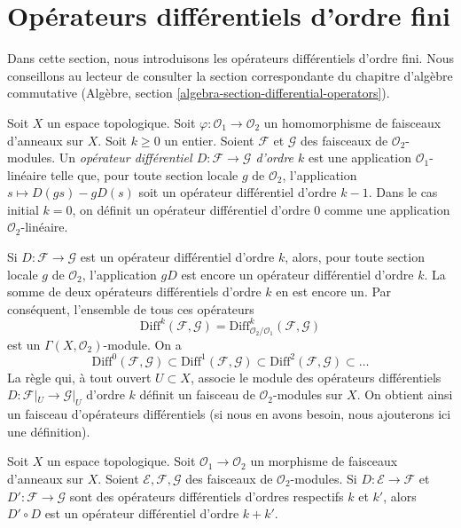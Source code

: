 \section{Opérateurs différentiels d'ordre fini}
\label{section-differential-operators}

\noindent
Dans cette section, nous introduisons les opérateurs différentiels d'ordre
fini. Nous conseillons au lecteur de consulter la section correspondante du
chapitre d'algèbre commutative (Algèbre, section
\ref{algebra-section-differential-operators}).

\begin{definition}
\label{definition-differential-operators}
Soit $X$ un espace topologique. Soit
$\varphi : \mathcal{O}_1 \to \mathcal{O}_2$ un homomorphisme de faisceaux
d'anneaux sur $X$. Soit $k \geq 0$ un entier. Soient $\mathcal{F}$ et
$\mathcal{G}$ des faisceaux de $\mathcal{O}_2$-modules. Un
{\it opérateur différentiel $D : \mathcal{F} \to \mathcal{G}$ d'ordre $k$}
est une application $\mathcal{O}_1$-linéaire telle que, pour toute section
locale $g$ de $\mathcal{O}_2$, l'application
$s \mapsto D(gs) - gD(s)$ soit un opérateur différentiel d'ordre $k - 1$.
Dans le cas initial $k = 0$, on définit un opérateur différentiel d'ordre $0$
comme une application $\mathcal{O}_2$-linéaire.
\end{definition}

\noindent
Si $D : \mathcal{F} \to \mathcal{G}$ est un opérateur différentiel d'ordre
$k$, alors, pour toute section locale $g$ de $\mathcal{O}_2$, l'application
$gD$ est encore un opérateur différentiel d'ordre $k$. La somme de deux
opérateurs différentiels d'ordre $k$ en est encore un. Par conséquent,
l'ensemble de tous ces opérateurs
$$
\text{Diff}^k(\mathcal{F}, \mathcal{G}) =
\text{Diff}^k_{\mathcal{O}_2/\mathcal{O}_1}(\mathcal{F}, \mathcal{G})
$$
est un $\Gamma(X, \mathcal{O}_2)$-module. On a
$$
\text{Diff}^0(\mathcal{F}, \mathcal{G}) \subset
\text{Diff}^1(\mathcal{F}, \mathcal{G}) \subset
\text{Diff}^2(\mathcal{F}, \mathcal{G}) \subset \ldots
$$
La règle qui, à tout ouvert $U \subset X$, associe le module des opérateurs
différentiels $D : \mathcal{F}|_U \to \mathcal{G}|_U$ d'ordre $k$ définit
un faisceau de $\mathcal{O}_2$-modules sur $X$. On obtient ainsi un faisceau
d'opérateurs différentiels (si nous en avons besoin, nous ajouterons ici une
définition).

\begin{lemma}
\label{lemma-composition-differential-operators}
Soit $X$ un espace topologique. Soit
$\mathcal{O}_1 \to \mathcal{O}_2$ un morphisme de faisceaux d'anneaux sur
$X$. Soient $\mathcal{E}, \mathcal{F}, \mathcal{G}$ des faisceaux de
$\mathcal{O}_2$-modules. Si $D : \mathcal{E} \to \mathcal{F}$ et
$D' : \mathcal{F} \to \mathcal{G}$ sont des opérateurs différentiels
d'ordres respectifs $k$ et $k'$, alors $D' \circ D$ est un opérateur
différentiel d'ordre $k + k'$.
\end{lemma}

